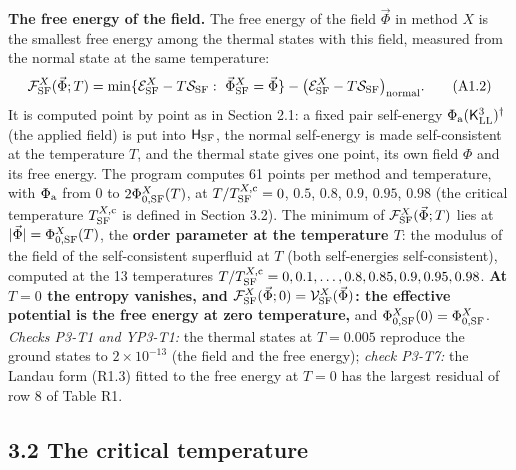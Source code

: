 \documentclass[
  10pt,
]{article}
\begin{document}
\textbf{The free energy of the field.} The free energy of the field
\(\vec\Phi\) in method \(X\) is the smallest free energy among the
thermal states with this field, measured from the normal state at the
same temperature:
\[\mathcal F^X_{\rm SF}(\vec\Phi;T)=\min\{\mathcal E^X_{\rm SF}-T\mathcal S_{\rm SF}:\ \vec\Phi^X_{\rm SF}=\vec\Phi\}-\big(\mathcal E^X_{\rm SF}-T\mathcal S_{\rm SF}\big)_{\rm normal}.\tag{A1.2}\]
It is computed point by point as in Section 2.1: a fixed pair
self-energy \(\Phi_{\rm a}(\mathsf K^3_{\rm LL})^\dagger\) (the applied
field) is put into \(\mathsf H_{\rm SF}\), the normal self-energy is
made self-consistent at the temperature \(T\), and the thermal state
gives one point, its own field \(\Phi\) and its free energy. The program
computes 61 points per method and temperature, with \(\Phi_{\rm a}\)
from \(0\) to \(2\Phi^X_{0,{\rm SF}}(T)\), at
\(T/T^{X,{\rm c}}_{\rm SF}=0\), \(0.5\), \(0.8\), \(0.9\), \(0.95\),
\(0.98\) (the critical temperature \(T^{X,{\rm c}}_{\rm SF}\) is defined
in Section 3.2). The minimum of \(\mathcal F^X_{\rm SF}(\vec\Phi;T)\)
lies at \(\lvert\vec\Phi\rvert=\Phi^X_{0,{\rm SF}}(T)\), the
\textbf{order parameter at the temperature \(T\)}: the modulus of the
field of the self-consistent superfluid at \(T\) (both self-energies
self-consistent), computed at the 13 temperatures
\(T/T^{X,{\rm c}}_{\rm SF}=0,0.1,\dots,0.8,0.85,0.9,0.95,0.98\).
\textbf{At \(T=0\) the entropy vanishes, and
\(\mathcal F^X_{\rm SF}(\vec\Phi;0)=\mathcal V^X_{\rm SF}(\vec\Phi)\):
the effective potential is the free energy at zero temperature,} and
\(\Phi^X_{0,{\rm SF}}(0)=\Phi^X_{0,{\rm SF}}\). \emph{Checks P3-T1 and
YP3-T1:} the thermal states at \(T=0.005\) reproduce the ground states
to \(2\times10^{-13}\) (the field and the free energy); \emph{check
P3-T7:} the Landau form (R1.3) fitted to the free energy at \(T=0\) has
the largest residual of row 8 of Table R1.

\hypertarget{the-critical-temperature}{%
\subsection{3.2 The critical
temperature}\label{the-critical-temperature}}
\end{document}
